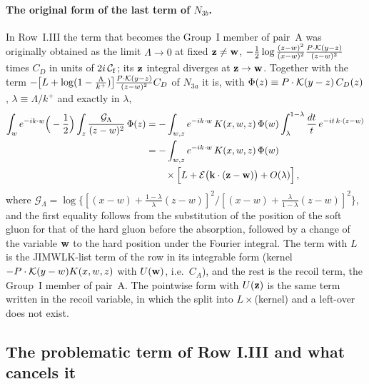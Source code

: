 \paragraph{The original form of the last term of $N_{3b}$.} In Row~I.III the term that becomes the Group~I member of pair~A was originally obtained as the limit $\Lambda\to0$ at fixed $\mathbf{z}\neq\mathbf{w}$, $-\frac{1}{2}\log\frac{(z-w)^2}{(x-w)^2}\frac{P\cdot\mathcal{K}(y-z)}{(z-w)^2}$ times $C_D$ in units of $2i\,\mathcal C_{\rm f}$; its $\mathbf{z}$ integral diverges at $\mathbf{z}\to\mathbf{w}$. Together with the term $-\big[L+\log(1-\frac{\Lambda}{k^+})\big]\frac{P\cdot\mathcal{K}(y-z)}{(z-w)^2}C_D$ of $N_{3a}$ it is, with $\Phi(z)\equiv P\cdot\mathcal{K}(y-z)\,C_D(z)$, $\lambda\equiv\Lambda/k^+$ and exactly in $\lambda$,
\begin{align}\label{eq:N3bexact}
\int_we^{-ik\cdot w}\Big(-\frac12\Big)\int_z\frac{\mathcal G_\Lambda}{(z-w)^2}\,\Phi(z)
&=-\int_{w,z}e^{-ik\cdot w}\,K(x,w,z)\,\Phi(w)\int_\lambda^{1-\lambda}\frac{dt}{t}\,e^{-it\,k\cdot(z-w)}\notag\\
&=-\int_{w,z}e^{-ik\cdot w}\,K(x,w,z)\,\Phi(w)\notag\\&\qquad\times\Big[L+\mathcal E\big(\mathbf{k}\cdot(\mathbf{z}-\mathbf{w})\big)+O(\lambda)\Big]\,,
\end{align}
where $\mathcal G_\Lambda=\log\big\{[(x-w)+\frac{1-\lambda}{\lambda}(z-w)]^2/[(x-w)+\frac{\lambda}{1-\lambda}(z-w)]^2\big\}$, and the first equality follows from the substitution of the position of the soft gluon for that of the hard gluon before the absorption, followed by a change of the variable $\mathbf{w}$ to the hard position under the Fourier integral. The term with $L$ is the JIMWLK-list term of the row in its integrable form (kernel $-P\cdot\mathcal{K}(y-w)K(x,w,z)$ with $U(\mathbf{w})$, i.e.\ $C_A$), and the rest is the recoil term, the Group~I member of pair~A. The pointwise form with $U(\mathbf{z})$ is the same term written in the recoil variable, in which the split into $L\times$(kernel) and a left-over does not exist.

\subsection{The problematic term of Row I.III and what cancels it}\label{sec:fin_GIIII}

